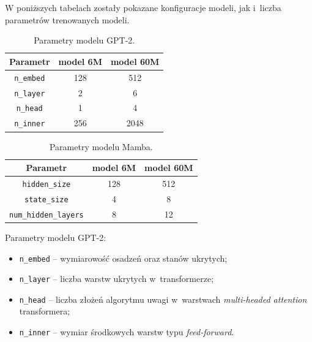 \documentclass[data-science]{agh-wi} %
\begin{document}
W poniższych tabelach zostały pokazane konfiguracje modeli, jak i~liczba parametrów trenowanych modeli.

\begin{table}[!htb]
    \caption{Parametry modelu GPT-2.}
    \centering
    \begin{tabular}{||c c c||}
        \hline
        Parametr          & model 6M & model 60M \\ [0.5ex]
        \hline\hline
        \texttt{n\_embed} & 128      & 512       \\
        \hline
        \texttt{n\_layer} & 2        & 6         \\
        \hline
        \texttt{n\_head}  & 1        & 4         \\
        \hline
        \texttt{n\_inner} & 256      & 2048      \\
        \hline
    \end{tabular}
\end{table}

\begin{table}[!htb]
    \caption{Parametry modelu Mamba.}
    \centering
    \begin{tabular}{||c c c||}
        \hline
        Parametr                     & model 6M & model 60M \\ [0.5ex]
        \hline\hline
        \texttt{hidden\_size}        & 128      & 512       \\
        \hline
        \texttt{state\_size}         & 4        & 8         \\
        \hline
        \texttt{num\_hidden\_layers} & 8        & 12        \\
        \hline
    \end{tabular}
\end{table}

Parametry modelu GPT-2:
\begin{itemize}
    \item \texttt{n\_embed} -- wymiarowość osadzeń oraz stanów ukrytych;
    \item \texttt{n\_layer} -- liczba warstw ukrytych w~transformerze;
    \item \texttt{n\_head} -- liczba złożeń algorytmu uwagi w~warstwach \textit{multi-headed attention} transformera;
    \item \texttt{n\_inner} -- wymiar środkowych warstw typu \textit{feed-forward}.
\end{itemize}
\end{document}
